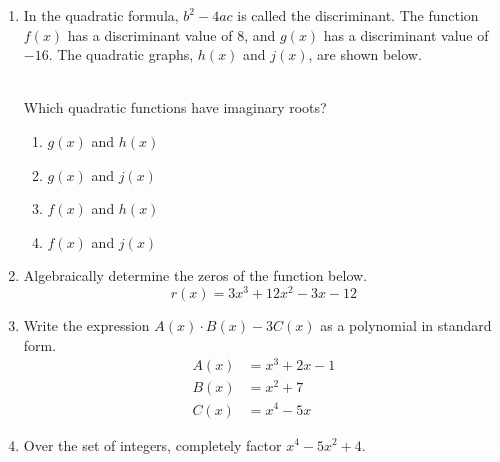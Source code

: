\documentclass[12pt, twoside]{article}
\begin{document}
\begin{enumerate}[itemsep=0.5cm]
\item In the quadratic formula, $b^2-4ac$ is called the discriminant. The function $f(x)$ has a discriminant value of 8, and $g(x)$ has a discriminant value of $-16$. The quadratic graphs, $h(x)$ and $j(x)$, are shown below. \\
 \;
 \\
Which quadratic functions have imaginary roots?
\begin{enumerate}
    \item $g(x)$ and $h(x)$
    \item $g(x)$ and $j(x)$
    \item $f(x)$ and $h(x)$
    \item $f(x)$ and $j(x)$
\end{enumerate}

\item Algebraically determine the zeros of the function below. %
$$r(x) = 3x^3+12x^2-3x-12$$

\item Write the expression $A(x) \cdot B(x) - 3C(x)$ as a polynomial in standard form. %
    \begin{align*}
        A(x) &= x^3 + 2x - 1 \\
        B(x) &= x^2 + 7 \\
        C(x) &= x^4 - 5x
    \end{align*}

\item Over the set of integers, completely factor $x^4-5x^2+4$.

\end{enumerate}
\end{document}

